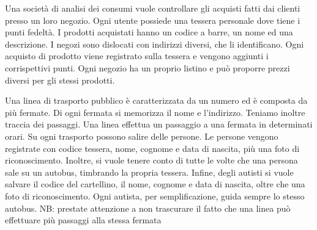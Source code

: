 \documentclass[addpoints]{exam}
\begin{document}
 
\begin{center}
\end{center}
 
\vspace{5mm}
 
 
\vspace{5mm}
 
\begin{questions}
	
\question Una società di analisi dei consumi vuole controllare gli acquisti fatti dai clienti presso un loro negozio. Ogni utente possiede una tessera personale dove tiene i punti fedeltà. I prodotti acquistati hanno un codice a barre, un nome ed una descrizione. I negozi sono dislocati con indirizzi diversi, che li identificano. Ogni acquisto di prodotto viene registrato sulla tessera e vengono aggiunti i corrispettivi punti. Ogni negozio ha un proprio listino e può proporre prezzi diversi per gli stessi prodotti.

 
\question Una linea di trasporto pubblico è caratterizzata da un numero ed è composta da più fermate. Di ogni fermata si memorizza il nome e l’indirizzo. Teniamo inoltre traccia dei passaggi. Una linea effettua un passaggio a una fermata in determinati orari. Su ogni trasporto possono salire delle persone. Le persone vengono registrate con codice tessera, nome, cognome e data di nascita, più una foto di riconoscimento. Inoltre, si vuole tenere conto di tutte le volte che una persona sale su un autobus, timbrando la propria tessera. Infine, degli autisti si vuole salvare il codice del cartellino, il nome, cognome e data di nascita, oltre che una foto di riconoscimento. Ogni autista, per semplificazione, guida sempre lo stesso autobus. NB: prestate attenzione a non trascurare il fatto che una linea può effettuare più passaggi alla stessa fermata
\begin{parts}

\end{parts}
\end{questions}
\end{document}
